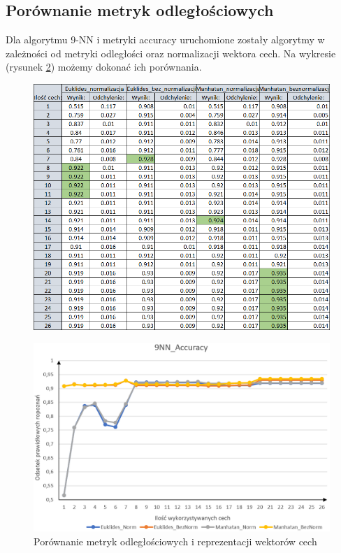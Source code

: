 \documentclass[12pt]{article}
\begin{document}
\subsection{Porównanie metryk odległościowych}
\indent Dla algorytmu 9-NN i metryki accuracy uruchomione zostały algorytmy w zależności od metryki odległości oraz normalizacji wektora cech. Na wykresie (rysunek \ref{odleglosci_wyk}) możemy dokonać ich porównania.
\begin{figure}[H]
	\centering
	\label{odleglosci_tab}
		\includegraphics[scale=0.77]{images/distance_metrics/distance_metrics_tab.png}
	
\end{figure}
\begin{figure}[H]
	\centering
		\includegraphics[scale=0.66]{images/distance_metrics/distance_metrics.png}
	\caption{Porównanie metryk odległościowych i reprezentacji wektorów cech}
	\label{odleglosci_wyk}
	
\end{figure}
\end{document}
